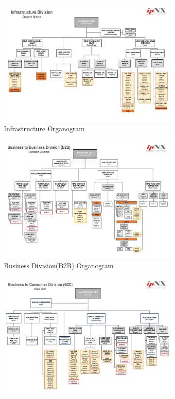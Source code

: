 \begin{figure}[h!]
	\centering
	\begin{subfigure}[b]{0.45\textwidth}
		\includegraphics[width=\textwidth]{./InfrastructureOrgan}
		\caption{Infrastructure Organogram}
	\end{subfigure}
	\begin{subfigure}[b]{0.45\textwidth}
		\includegraphics[width=\textwidth]{./B2Borg}
		\caption{Business Division(B2B) Organogram}
	\end{subfigure}
	\begin{subfigure}[b]{0.5\textwidth}
		\includegraphics[width=\textwidth]{./B2COrgan}

\end{subfigure}
\end{figure}
